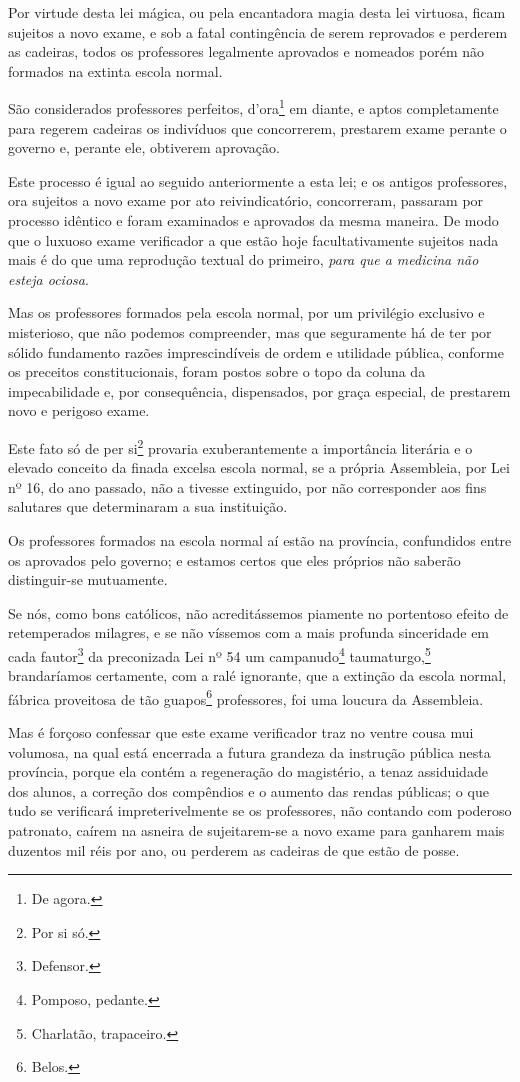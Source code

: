 Por virtude desta lei mágica, ou pela encantadora magia desta lei
virtuosa, ficam sujeitos a novo exame, e sob a fatal contingência de
serem reprovados e perderem as cadeiras, todos os professores legalmente
aprovados e nomeados porém não formados na extinta escola normal.

São considerados professores perfeitos, d'ora\footnote{De agora.} em
diante, e aptos completamente para regerem cadeiras os indivíduos que
concorrerem, prestarem exame perante o governo e, perante ele, obtiverem
aprovação.

Este processo é igual ao seguido anteriormente a esta lei; e os antigos
professores, ora sujeitos a novo exame por ato reivindicatório,
concorreram, passaram por processo idêntico e foram examinados e
aprovados da mesma maneira. De modo que o luxuoso exame verificador a
que estão hoje facultativamente sujeitos nada mais é do que uma
reprodução textual do primeiro, \emph{para que a medicina não esteja
ociosa}.

Mas os professores formados pela escola normal, por um privilégio
exclusivo e misterioso, que não podemos compreender, mas que seguramente
há de ter por sólido fundamento razões imprescindíveis de ordem e
utilidade pública, conforme os preceitos constitucionais, foram postos
sobre o topo da coluna da impecabilidade e, por consequência,
dispensados, por graça especial, de prestarem novo e perigoso exame.

Este fato só de per si\footnote{Por si só.} provaria exuberantemente a
importância literária e o elevado conceito da finada excelsa escola
normal, se a própria Assembleia, por Lei nº 16, do ano passado, não a
tivesse extinguido, por não corresponder aos fins salutares que
determinaram a sua instituição.

Os professores formados na escola normal aí estão na província,
confundidos entre os aprovados pelo governo; e estamos certos que eles
próprios não saberão distinguir-se mutuamente.

Se nós, como bons católicos, não acreditássemos piamente no portentoso
efeito de retemperados milagres, e se não víssemos com a mais profunda
sinceridade em cada fautor\footnote{Defensor.} da preconizada Lei nº
54 um campanudo\footnote{Pomposo, pedante.} taumaturgo,\footnote{
  Charlatão, trapaceiro.} brandaríamos certamente, com a ralé
ignorante, que a extinção da escola normal, fábrica proveitosa de tão
guapos\footnote{Belos.} professores, foi uma loucura da Assembleia.

Mas é forçoso confessar que este exame verificador traz no ventre cousa
mui volumosa, na qual está encerrada a futura grandeza da instrução
pública nesta província, porque ela contém a regeneração do magistério,
a tenaz assiduidade dos alunos, a correção dos compêndios e o aumento
das rendas públicas; o que tudo se verificará impreterivelmente se os
professores, não contando com poderoso patronato, caírem na asneira de
sujeitarem-se a novo exame para ganharem mais duzentos mil réis por ano,
ou perderem as cadeiras de que estão de posse.

